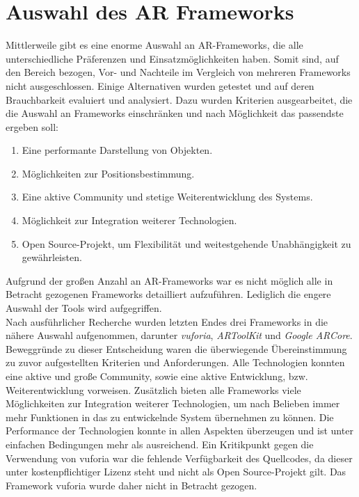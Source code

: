 \section{Auswahl des AR Frameworks}
\label{chap:Auswahl des AR Frameworks}
Mittlerweile gibt es eine enorme Auswahl an \acs{AR}-Frameworks, die alle unterschiedliche Präferenzen und 
Einsatzmöglichkeiten haben. Somit sind, auf den Bereich bezogen, Vor- und Nachteile im Vergleich von mehreren Frameworks nicht ausgeschlossen. 
Einige Alternativen wurden getestet und auf deren Brauchbarkeit evaluiert und analysiert. Dazu wurden Kriterien ausgearbeitet, die die 
Auswahl an Frameworks einschränken und nach Möglichkeit das passendste ergeben soll: 
\pagebreak
\begin{enumerate}
    \item Eine performante Darstellung von Objekten.
    \item Möglichkeiten zur Positionsbestimmung.
    \item Eine aktive Community und stetige Weiterentwicklung des Systems.
    \item Möglichkeit zur Integration weiterer Technologien.
    \item Open Source-Projekt, um Flexibilität und weitestgehende Unabhängigkeit zu gewährleisten.
\end{enumerate}
Aufgrund der großen Anzahl an \acs{AR}-Frameworks war es nicht möglich alle in Betracht gezogenen Frameworks detailliert aufzuführen. 
Lediglich die engere Auswahl der Tools wird aufgegriffen. 
\\ 
Nach ausführlicher Recherche wurden letzten Endes drei Frameworks in die nähere Auswahl aufgenommen, darunter \textit{vuforia}, 
\textit{ARToolKit} und \textit{Google ARCore}. Beweggründe zu dieser Entscheidung waren die überwiegende 
Übereinstimmung zu zuvor aufgestellten Kriterien und Anforderungen. Alle Technologien konnten eine aktive und große Community, sowie eine 
aktive Entwicklung, bzw. Weiterentwicklung vorweisen. Zusätzlich bieten alle Frameworks viele Möglichkeiten zur Integration weiterer 
Technologien, um nach Belieben immer mehr Funktionen in das zu entwickelnde System übernehmen zu können. Die Performance der Technologien konnte 
in allen Aspekten überzeugen und ist unter einfachen Bedingungen mehr als ausreichend. Ein Kritikpunkt gegen die Verwendung von vuforia war 
die fehlende Verfügbarkeit des Quellcodes, da dieser unter kostenpflichtiger Lizenz steht und nicht als Open Source-Projekt gilt. Das Framework 
vuforia wurde daher nicht in Betracht gezogen.
